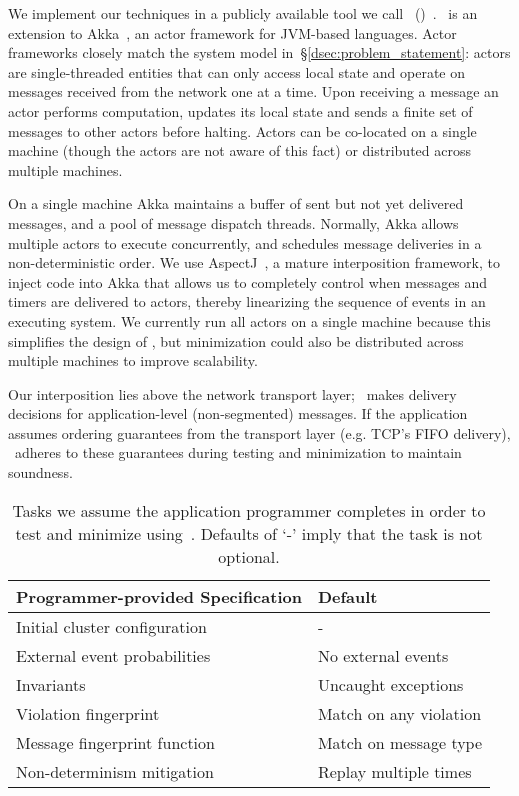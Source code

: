 We implement our techniques in a publicly available tool we call \sys~(\system)~\cite{our_repo}. \sys~is an extension
to Akka~\cite{akka}, an actor
framework for JVM-based languages.
Actor frameworks closely match the system model in~\S\ref{dsec:problem_statement}: actors
are single-threaded entities that can only access local state and operate on messages
received from the network one at a time. Upon receiving a message an actor performs computation,
updates its local state and sends a finite set of messages to other actors
before halting. Actors can be co-located
on a single machine (though the actors are not aware of this fact) or distributed across multiple machines.

On a single machine Akka maintains a buffer of sent but not yet delivered
messages, and a pool of message dispatch threads.
Normally, Akka allows multiple actors to execute
concurrently, and schedules message deliveries in a
non-deterministic order. We use AspectJ~\cite{kiczales2001overview}, a mature interposition framework,
to inject code into Akka that allows us to completely control when messages
and timers are
delivered to actors, thereby linearizing the sequence of events in an executing system.
We currently run all actors on a single machine because this simplifies the
design of \sys,
but minimization could also be distributed across multiple machines to improve
scalability.

Our interposition lies above the network transport layer; \sys~makes
delivery decisions for application-level (non-segmented) messages.
If the application assumes ordering guarantees from the transport
layer (e.g. TCP's FIFO delivery), \sys~adheres to these guarantees
during testing and minimization to maintain soundness.

\begin{table}[tb]
\centering
\footnotesize
\begin{tabular}{l|l}
\textbf{Programmer-provided Specification} & \textbf{Default} \\
\hline
Initial cluster configuration & - \\
External event probabilities & No external events \\
Invariants & Uncaught exceptions \\
Violation fingerprint & Match on any violation \\
Message fingerprint function & Match on message type \\
Non-determinism mitigation & Replay multiple times
\end{tabular}
\caption{\label{tab:programmer_tasks} Tasks we assume the application
programmer completes in order to test and minimize using~\sys. Defaults
of `-' imply that the task is not optional.}
\end{table}

